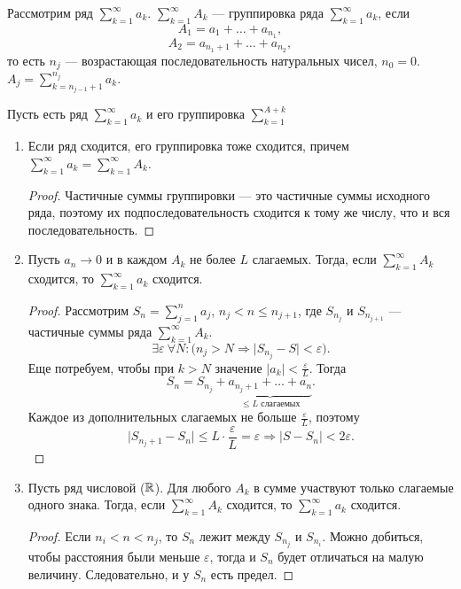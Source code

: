 % 
% 

\begin{defn}
    Рассмотрим ряд $ \sum_{k=1}^{\infty} a_k$.
	$ \sum_{k=1}^{\infty}{A_k} $ --- {\sf группировка ряда} $ \sum_{k=1}^{\infty} a_k$, 
	если 
	$$ A_1= a_1 + \ldots + a_{n_1},$$ 
	$$ A_2 = a_{n_1+1} + \ldots  + a_{n_2},$$
	то есть $ n_j$ --- возрастающая последовательность натуральных чисел, $ n_0= 0$. $ A_j = \sum_{k=n_{j-1}+1}^{n_j} a_k$.
\end{defn}
\begin{thm} 
	Пусть есть ряд $ \sum_{k=1}^{\infty} a_k$ и его группировка $ \sum_{k=1}^{A+k} $ 
    \begin{enumerate}[noitemsep]
		\item Если ряд сходится, его группировка тоже сходится, причем $ \sum_{k=1}^{\infty} a_k = \sum_{k=1}^{\infty} A_k$.
			\begin{proof}
			    Частичные суммы группировки --- это частичные суммы исходного ряда, поэтому их подпоследовательность сходится к тому же числу, что и вся последовательность.
			\end{proof}
	    \item Пусть $ a_n \to  0$ и в каждом  $ A_k$ не более $ L$ слагаемых.
			Тогда, если $ \sum_{k=1}^{\infty} A_k$ сходится, то $ \sum_{k=1}^{\infty} a_k$ сходится.
		\begin{proof}
		    Рассмотрим $ S_n = \sum_{j=1}^{n} a_j$,
			$ n_j < n \le n_{j+1}$, где $ S_{n_j}$ и $ S_{n_{j+1}}$ --- частичные суммы ряда $ \sum_{k=1}^{\infty} A_k$.
		    \[
				\exists \varepsilon ~ \forall  N \colon \bigl( n_j > N \Longrightarrow \lvert S_{n_j} - S \rvert < \varepsilon \bigr)
		    .\] 
			Еще потребуем, чтобы при $ k > N$ значение $ \lvert a_k \rvert  < \frac{\varepsilon}{L} $.
			Тогда 
			\[
				S_n = S_{n_j} + \underbrace{a_{n_{j}+1} + \ldots + a_{n}}_{ \le L \text{ слагаемых}}
			.\] 
			Каждое из дополнительных слагаемых не больше $ \frac{\varepsilon}{L}$, поэтому
			\[
			\lvert S_{n_{j}+1} - S_{n} \rvert \le L \cdot \frac{\varepsilon}{L} = \varepsilon \Longrightarrow \lvert S - S_n \rvert < 2\varepsilon 
			.\] 
		\end{proof}
	\item Пусть ряд числовой ($ \mathbb{R}$). Для любого $ A_k$ в сумме участвуют только слагаемые одного знака. 
		Тогда, если $ \sum_{k=1}^{\infty} A_k$ сходится, то $ \sum_{k=1}^{\infty} a_k$ сходится.
		\begin{proof}
		     Если $ n_i < n < n_j$, то  $ S_{n}$ лежит между $ S_{n_j}$ и $ S_{n_i}$.
			 Можно добиться, чтобы расстояния были меньше $ \varepsilon $, тогда и $ S_n$ будет отличаться на малую величину.
			 Следовательно, и у $ S_n$ есть предел.
		\end{proof}
    \end{enumerate}
\end{thm}


